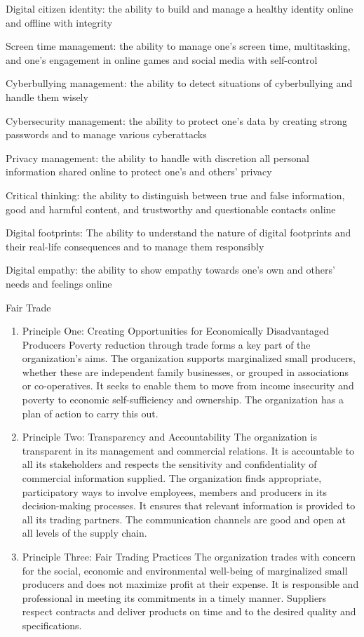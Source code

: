 \documentclass[]{book}
\begin{document}
Digital citizen identity: the ability to build and manage a healthy identity online and offline with integrity

Screen time management: the ability to manage one's screen time, multitasking, and one's engagement in online games and social media with self-control

Cyberbullying management: the ability to detect situations of cyberbullying and handle them wisely

Cybersecurity management: the ability to protect one's data by creating strong passwords and to manage various cyberattacks

Privacy management: the ability to handle with discretion all personal information shared online to protect one's and others' privacy

Critical thinking: the ability to distinguish between true and false information, good and harmful content, and trustworthy and questionable contacts online

Digital footprints: The ability to understand the nature of digital footprints and their real-life consequences and to manage them responsibly

Digital empathy: the ability to show empathy towards one's own and others' needs and feelings online

Fair Trade

\begin{enumerate}
\def\labelenumi{\arabic{enumi}.}
\item
  Principle One: Creating Opportunities for Economically Disadvantaged Producers
  Poverty reduction through trade forms a key part of the organization's aims. The organization supports marginalized small producers, whether these are independent family businesses, or grouped in associations or co-operatives. It seeks to enable them to move from income insecurity and poverty to economic self-sufficiency and ownership. The organization has a plan of action to carry this out.
\item
  Principle Two: Transparency and Accountability
  The organization is transparent in its management and commercial relations. It is accountable to all its stakeholders and respects the sensitivity and confidentiality of commercial information supplied. The organization finds appropriate, participatory ways to involve employees, members and producers in its decision-making processes. It ensures that relevant information is provided to all its trading partners. The communication channels are good and open at all levels of the supply chain.
\item
  Principle Three: Fair Trading Practices
  The organization trades with concern for the social, economic and environmental well-being of marginalized small producers and does not maximize profit at their expense. It is responsible and professional in meeting its commitments in a timely manner. Suppliers respect contracts and deliver products on time and to the desired quality and specifications.
\end{enumerate}
\end{document}
